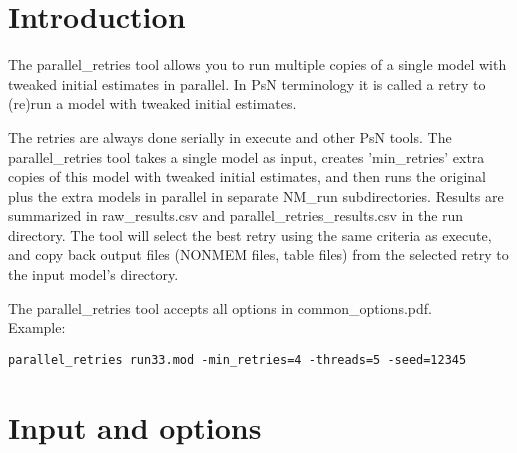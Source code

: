 



\maketitle
\newcommand{\guidetoolname}{parallel\_retries}


\section{Introduction}
The parallel\_retries tool allows you to run multiple copies of a single model with tweaked initial estimates in parallel.
In PsN terminology it is called a retry to (re)run a model with tweaked initial estimates.

The retries are always done serially in execute and other PsN tools. The parallel\_retries tool takes a single model as input, creates 'min\_retries' extra copies of this model with tweaked initial estimates, and then runs the original plus the extra models in parallel in separate NM\_run subdirectories. Results are summarized in raw\_results.csv and parallel\_retries\_results.csv in the run directory. The tool will select the best retry using the same criteria as execute, and copy back output files (NONMEM files, table files) from the selected retry to the input model's directory.

The parallel\_retries tool accepts all options in common\_options.pdf.\\ 

Example:
\begin{verbatim}
parallel_retries run33.mod -min_retries=4 -threads=5 -seed=12345
\end{verbatim}

\section{Input and options}
